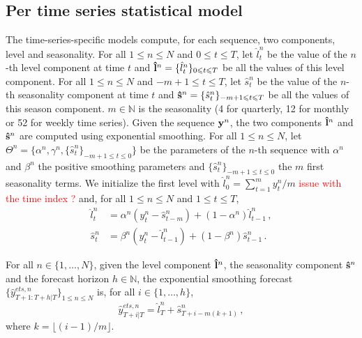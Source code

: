 \documentclass[letterpaper]{article} %
\newcommand{\ts}{y}
\newcommand{\fullts}{{\bf \ts}}
\newcommand{\lvl}{\hat{l}}
\newcommand{\fulllvl}{{\bf \lvl}}
\newcommand{\seas}{\hat{s}}
\newcommand{\fullseas}{{\bf \seas}}
\newcommand{\lsmooth}{\alpha}
\newcommand{\ssmooth}{\beta}
\newcommand{\lag}{h}
\newcommand{\etspred}{\hat{y}}
\begin{document}

\subsection{Per time series statistical model}
The time-series-specific models compute, for each sequence, two components,  level  and  seasonality. For all $1\leqslant n \leqslant N$ and $0\leqslant t \leqslant T$, let $\lvl_t^n$ be the value of the $n$-th level component at time $t$ and  $\fulllvl^n = \{\lvl_t^n\}_{0\leqslant t \leqslant T}$ be all the values of this level component. For all $1\leqslant n \leqslant N$ and $-m+1\leqslant t \leqslant T$, let $\seas_t^n$ be the value of the $n$-th seasonality component at time $t$ and  $\fullseas^n = \{\seas_t^n\}_{-m+1\leqslant t \leqslant T}$ be all the values of this season component. $m \in \mathbb{N}$ is the seasonality (4 for quarterly, 12 for monthly or 52 for weekly time series). Given the sequence $\fullts^n$, the two components  $\fulllvl^n$ and $\fullseas^n$ are computed using exponential smoothing.
For all $1\leqslant n \leqslant N$, let $\Theta^n = \{\alpha^n, \gamma^n,\{\seas_t^n\}_{-m+1\leqslant t \leqslant 0}\}$ be the parameters of the $n$-th sequence with $\lsmooth^n$ and $\ssmooth^n$ the positive smoothing parameters and $\{\seas_t^n\}_{-m+1\leqslant t \leqslant 0}$ the $m$ first seasonality terms. We initialize the first level with $\lvl^n_{0} = \sum_{t = 1}^m \ts^n_{t}/m$ \textcolor{red}{issue with the time index ?} and, for all $1\leqslant n \leqslant N$ and $1\leqslant t \leqslant T$,
\begin{align*}
    \lvl^n_{t} &= \lsmooth^n (\ts^n_t - \seas^n_{t-m}) + (1- \lsmooth^n)\lvl^n_{t-1}\,, \\
    \seas^n_t &= \ssmooth^n (\ts^n_t - \lvl^n_{t-1}) + (1 - \ssmooth^n)\seas^n_{t-1}\,. 
\end{align*}

For all $n \in \{1,\ldots,N\}$, given the level component $\fulllvl^n$, the seasonality component $\fullseas^n$ and the forecast horizon $\lag \in \mathbb{N}$, the exponential smoothing forecast $\{\etspred^{ets,n}_{T+1:T+\lag|T}\}_{1\leqslant n \leqslant N}$ is, for all $i \in \{1,\ldots,\lag\}$,
$$
\etspred^{ets,n}_{T+i|T} = \lvl^n_T + \seas^n_{T+i-m(k+1)}\,,
$$
where $k = \lfloor(i-1)/m\rfloor$. 
\end{document}

